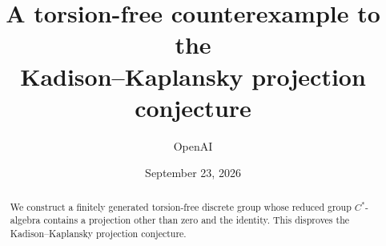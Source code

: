 \documentclass[11pt]{article}
\title{A torsion-free counterexample to the\\
Kadison--Kaplansky projection conjecture}
\author{OpenAI}
\date{September 23, 2026}
\begin{document}
\maketitle
\begin{abstract}
We construct a finitely generated torsion-free discrete group whose reduced
group \(C^*\)-algebra contains a projection other than zero and the identity.
This disproves the Kadison--Kaplansky projection conjecture.
\end{abstract}
\tableofcontents
\clearpage











\clearpage


\end{document}
